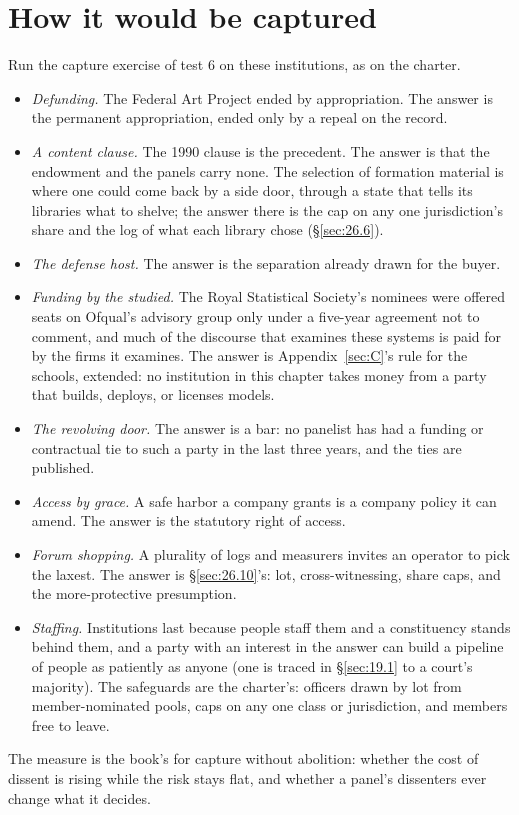 \section{How it would be captured}
\label{sec:28.7}
Run the capture exercise of test 6 on these institutions, as on the charter.

\begin{itemize}
\item \emph{Defunding.} The Federal Art Project ended by appropriation. The answer is the permanent appropriation, ended only by a repeal on the record.
\item \emph{A content clause.} The 1990 clause is the precedent. The answer is that the endowment and the panels carry none. The selection of formation material is where one could come back by a side door, through a state that tells its libraries what to shelve; the answer there is the cap on any one jurisdiction's share and the log of what each library chose (\S\ref{sec:26.6}).
\item \emph{The defense host.} The answer is the separation already drawn for the buyer.
\item \emph{Funding by the studied.} The Royal Statistical Society's nominees were offered seats on Ofqual's advisory group only under a five-year agreement not to comment, and much of the discourse that examines these systems is paid for by the firms it examines. The answer is Appendix~\ref{sec:C}'s rule for the schools, extended: no institution in this chapter takes money from a party that builds, deploys, or licenses models.
\item \emph{The revolving door.} The answer is a bar: no panelist has had a funding or contractual tie to such a party in the last three years, and the ties are published.
\item \emph{Access by grace.} A safe harbor a company grants is a company policy it can amend. The answer is the statutory right of access.
\item \emph{Forum shopping.} A plurality of logs and measurers invites an operator to pick the laxest. The answer is \S\ref{sec:26.10}'s: lot, cross-witnessing, share caps, and the more-protective presumption.
\item \emph{Staffing.} Institutions last because people staff them and a constituency stands behind them, and a party with an interest in the answer can build a pipeline of people as patiently as anyone (one is traced in \S\ref{sec:19.1} to a court's majority). The safeguards are the charter's: officers drawn by lot from member-nominated pools, caps on any one class or jurisdiction, and members free to leave.
\end{itemize}

The measure is the book's for capture without abolition: whether the cost of dissent is rising while the risk stays flat, and whether a panel's dissenters ever change what it decides.
